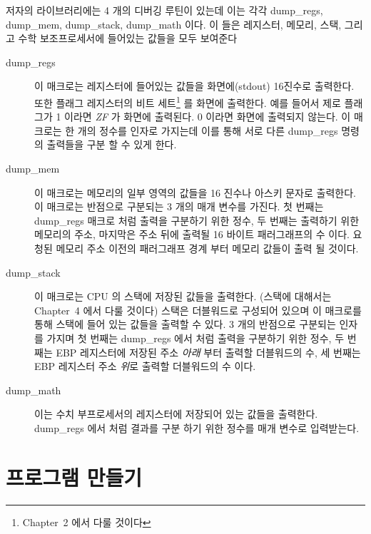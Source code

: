 저자의 라이브러리에는 4 개의 디버깅 루틴이 있는데 이는 각각 {\code dump\_regs}, {\code
dump\_mem}, {\code dump\_stack}, {\code dump\_math} 이다. 이 들은 레지스터, 메모리, 스택, 그리고 수학 보조프로세서에 들어있는 값들을 모두 보여준다

\begin{description}

\item[dump\_regs]
이 매크로는 레지스터에 들어있는 값들을 화면에({\code stdout}) 16진수로 출력한다. 또한 플래그 레지스터의  비트 세트\footnote{Chapter~2 에서 다룰 것이다} 
를 화면에 출력한다. 예를 들어서 제로 플래그가 1 이라면 \emph{ZF} 가 화면에 출력된다. 0 이라면 화면에 출력되지 않는다. 이 매크로는 한 개의 정수를 인자로
가지는데 이를 통해 서로 다른 {\code dump\_regs} 명령의 출력들을 구분 할 수 있게 한다. 

\item[dump\_mem]
이 매크로는 메모리의 일부 영역의 값들을 16 진수나 아스키 문자로 출력한다. 이 매크로는 반점으로 구분되는 3 개의 매개 변수를 가진다.
첫 번째는 {\code dump\_regs} 매크로 처럼 출력을 구분하기 위한 정수, 두 번째는 출력하기 위한 메모리의 주소, 마지막은 주소 뒤에 출력될 16 바이트 
패러그래프의 수 이다.  요청된 메모리 주소 이전의 패러그래프 경계 부터 메모리 값들이 출력 될 것이다. 

\item[dump\_stack]
이 매크로는 CPU 의 스택에 저장된 값들을 출력한다. (스택에 대해서는 Chapter~4 에서 다룰 것이다) 스택은 더블워드로 구성되어 있으며 이 매크로를 통해
스택에 들어 있는 값들을 출력할 수 있다. 3 개의 반점으로 구분되는 인자를 가지며 첫 번째는 {\code dump\_regs} 에서 처럼 출력을 구분하기 위한 정수, 두 번째는 
{\code EBP} 레지스터에 저장된 주소 \emph{아래} 부터 출력할 더블워드의 수, 세 번째는 {\code EBP} 레지스터 주소 \emph{위}로 출력할 더블워드의 수 이다. 

\item[dump\_math]
이는 수치 부프로세서의 레지스터에 저장되어 있는 값들을 출력한다. {\code dump\_regs} 에서 처럼 결과를 구분 하기 위한 정수를 매개 변수로 입력받는다.
\end{description}

\section{프로그램 만들기}

